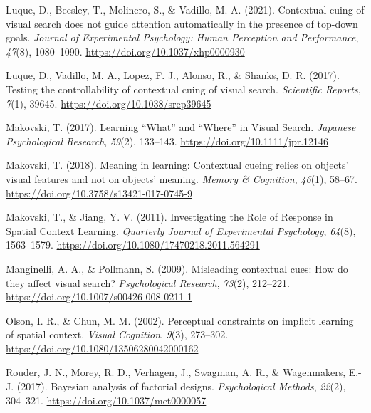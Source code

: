 \documentclass[
  man,floatsintext]{apa7}
\newlength{\cslhangindent}
\newlength{\cslentryspacingunit} %
\newenvironment{CSLReferences}[2] %
 {%
  \setlength{\parindent}{0pt}
  \ifodd #1
  \let\oldpar\par
  \def\par{\hangindent=\cslhangindent\oldpar}
  \fi
  \setlength{\parskip}{#2\cslentryspacingunit}
 }%
 {}
\begin{document}
\begin{CSLReferences}{1}{0}
\leavevmode{}%
Luque, D., Beesley, T., Molinero, S., \& Vadillo, M. A. (2021). Contextual cuing of visual search does not guide attention automatically in the presence of top-down goals. \emph{Journal of Experimental Psychology: Human Perception and Performance}, \emph{47}(8), 1080--1090. \url{https://doi.org/10.1037/xhp0000930}

\leavevmode{}%
Luque, D., Vadillo, M. A., Lopez, F. J., Alonso, R., \& Shanks, D. R. (2017). Testing the controllability of contextual cuing of visual search. \emph{Scientific Reports}, \emph{7}(1), 39645. \url{https://doi.org/10.1038/srep39645}

\leavevmode{}%
Makovski, T. (2017). Learning {``{What}''} and {``{Where}''} in {Visual Search}. \emph{Japanese Psychological Research}, \emph{59}(2), 133--143. \url{https://doi.org/10.1111/jpr.12146}

\leavevmode{}%
Makovski, T. (2018). Meaning in learning: {Contextual} cueing relies on objects' visual features and not on objects' meaning. \emph{Memory \& Cognition}, \emph{46}(1), 58--67. \url{https://doi.org/10.3758/s13421-017-0745-9}

\leavevmode{}%
Makovski, T., \& Jiang, Y. V. (2011). Investigating the {Role} of {Response} in {Spatial Context Learning}. \emph{Quarterly Journal of Experimental Psychology}, \emph{64}(8), 1563--1579. \url{https://doi.org/10.1080/17470218.2011.564291}

\leavevmode{}%
Manginelli, A. A., \& Pollmann, S. (2009). Misleading contextual cues: {How} do they affect visual search? \emph{Psychological Research}, \emph{73}(2), 212--221. \url{https://doi.org/10.1007/s00426-008-0211-1}

\leavevmode{}%
Olson, I. R., \& Chun, M. M. (2002). Perceptual constraints on implicit learning of spatial context. \emph{Visual Cognition}, \emph{9}(3), 273--302. \url{https://doi.org/10.1080/13506280042000162}

\leavevmode{}%
Rouder, J. N., Morey, R. D., Verhagen, J., Swagman, A. R., \& Wagenmakers, E.-J. (2017). Bayesian analysis of factorial designs. \emph{Psychological Methods}, \emph{22}(2), 304--321. \url{https://doi.org/10.1037/met0000057}


\end{CSLReferences}
\end{document}
